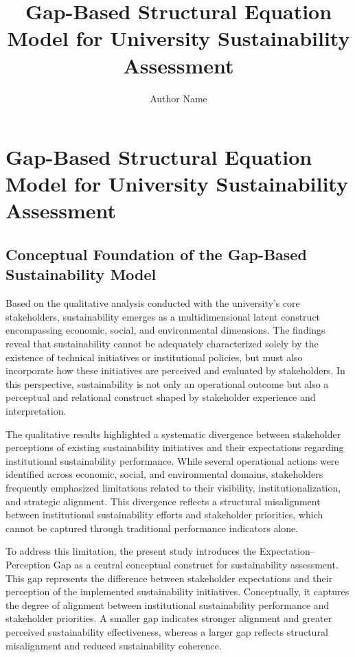 \documentclass[11pt,a4paper]{article}
\begin{document}
\title{Gap-Based Structural Equation Model for University Sustainability Assessment}

\author{Author Name}

\date{}

\maketitle

\section{Gap-Based Structural Equation Model for University Sustainability Assessment}



\subsection{Conceptual Foundation of the Gap-Based Sustainability Model}

Based on the qualitative analysis conducted with the university’s core stakeholders, sustainability emerges as a multidimensional latent construct encompassing economic, social, and environmental dimensions. The findings reveal that sustainability cannot be adequately characterized solely by the existence of technical initiatives or institutional policies, but must also incorporate how these initiatives are perceived and evaluated by stakeholders. In this perspective, sustainability is not only an operational outcome but also a perceptual and relational construct shaped by stakeholder experience and interpretation.

The qualitative results highlighted a systematic divergence between stakeholder perceptions of existing sustainability initiatives and their expectations regarding institutional sustainability performance. While several operational actions were identified across economic, social, and environmental domains, stakeholders frequently emphasized limitations related to their visibility, institutionalization, and strategic alignment. This divergence reflects a structural misalignment between institutional sustainability efforts and stakeholder priorities, which cannot be captured through traditional performance indicators alone.

To address this limitation, the present study introduces the Expectation--Perception Gap as a central conceptual construct for sustainability assessment. This gap represents the difference between stakeholder expectations and their perception of the implemented sustainability initiatives. Conceptually, it captures the degree of alignment between institutional sustainability performance and stakeholder priorities. A smaller gap indicates stronger alignment and greater perceived sustainability effectiveness, whereas a larger gap reflects structural misalignment and reduced sustainability coherence.
\end{document}
